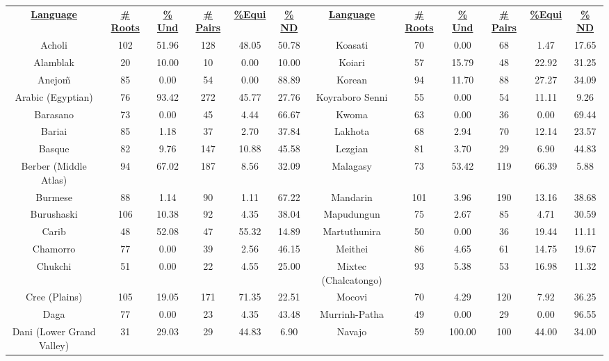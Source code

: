 \begin{tabular}{cccccccccccc}
\underline{\textbf{Language}} & \underline{\textbf{\# Roots}} & \underline{\textbf{\% Und}} & \underline{\textbf{\# Pairs}} & \underline{\textbf{\%Equi}} & \underline{\textbf{\% ND}} & \underline{\textbf{Language}} & \underline{\textbf{\# Roots}} & \underline{\textbf{\% Und}} & \underline{\textbf{\# Pairs}} & \underline{\textbf{\%Equi}} & \underline{\textbf{\% ND}} \\
Acholi & 102 & 51.96 & 128 & 48.05 & 50.78 & Koasati & 70 & 0.00 & 68 & 1.47 & 17.65 \\
Alamblak & 20 & 10.00 & 10 & 0.00 & 10.00 & Koiari & 57 & 15.79 & 48 & 22.92 & 31.25 \\
Anejo\~{m} & 85 & 0.00 & 54 & 0.00 & 88.89 & Korean & 94 & 11.70 & 88 & 27.27 & 34.09 \\
Arabic (Egyptian) & 76 & 93.42 & 272 & 45.77 & 27.76 & Koyraboro Senni & 55 & 0.00 & 54 & 11.11 & 9.26 \\
Barasano & 73 & 0.00 & 45 & 4.44 & 66.67 & Kwoma & 63 & 0.00 & 36 & 0.00 & 69.44 \\
Bariai & 85 & 1.18 & 37 & 2.70 & 37.84 & Lakhota & 68 & 2.94 & 70 & 12.14 & 23.57 \\
Basque & 82 & 9.76 & 147 & 10.88 & 45.58 & Lezgian & 81 & 3.70 & 29 & 6.90 & 44.83 \\
Berber (Middle Atlas) & 94 & 67.02 & 187 & 8.56 & 32.09 & Malagasy & 73 & 53.42 & 119 & 66.39 & 5.88 \\
Burmese & 88 & 1.14 & 90 & 1.11 & 67.22 & Mandarin & 101 & 3.96 & 190 & 13.16 & 38.68 \\
Burushaski & 106 & 10.38 & 92 & 4.35 & 38.04 & Mapudungun & 75 & 2.67 & 85 & 4.71 & 30.59 \\
Carib & 48 & 52.08 & 47 & 55.32 & 14.89 & Martuthunira & 50 & 0.00 & 36 & 19.44 & 11.11 \\
Chamorro & 77 & 0.00 & 39 & 2.56 & 46.15 & Meithei & 86 & 4.65 & 61 & 14.75 & 19.67 \\
Chukchi & 51 & 0.00 & 22 & 4.55 & 25.00 & Mixtec (Chalcatongo) & 93 & 5.38 & 53 & 16.98 & 11.32 \\
Cree (Plains) & 105 & 19.05 & 171 & 71.35 & 22.51 & Mocovi & 70 & 4.29 & 120 & 7.92 & 36.25 \\
Daga & 77 & 0.00 & 23 & 4.35 & 43.48 & Murrinh-Patha & 49 & 0.00 & 29 & 0.00 & 96.55 \\
Dani (Lower Grand Valley) & 31 & 29.03 & 29 & 44.83 & 6.90 & Navajo & 59 & 100.00 & 100 & 44.00 & 34.00 \\

\end{tabular}
